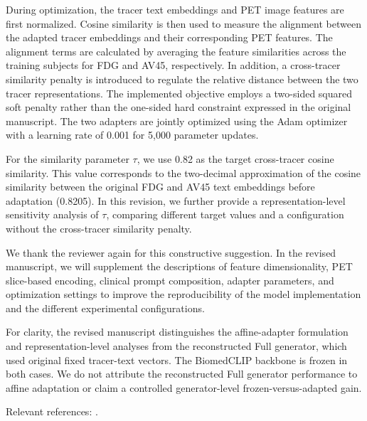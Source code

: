 {During optimization, the tracer text embeddings and PET image features are first normalized. Cosine similarity is then used to measure the alignment between the adapted tracer embeddings and their corresponding PET features. The alignment terms are calculated by averaging the feature similarities across the training subjects for FDG and AV45, respectively. In addition, a cross-tracer similarity penalty is introduced to regulate the relative distance between the two tracer representations. The implemented objective employs a two-sided squared soft penalty rather than the one-sided hard constraint expressed in the original manuscript. The two adapters are jointly optimized using the Adam optimizer with a learning rate of 0.001 for 5,000 parameter updates.

For the similarity parameter \ensuremath{\tau}, we use 0.82 as the target cross-tracer cosine similarity. This value corresponds to the two-decimal approximation of the cosine similarity between the original FDG and AV45 text embeddings before adaptation (0.8205). In this revision, we further provide a representation-level sensitivity analysis of \ensuremath{\tau}, comparing different target values and a configuration without the cross-tracer similarity penalty.

We thank the reviewer again for this constructive suggestion. In the revised manuscript, we will supplement the descriptions of feature dimensionality, PET slice-based encoding, clinical prompt composition, adapter parameters, and optimization settings to improve the reproducibility of the model implementation and the different experimental configurations.

For clarity, the revised manuscript distinguishes the affine-adapter formulation and representation-level analyses from the reconstructed Full generator, which used original fixed tracer-text vectors. The BiomedCLIP backbone is frozen in both cases. We do not attribute the reconstructed Full generator performance to affine adaptation or claim a controlled generator-level frozen-versus-adapted gain.

Relevant references: \cite{zhang2025multimodal}.}


